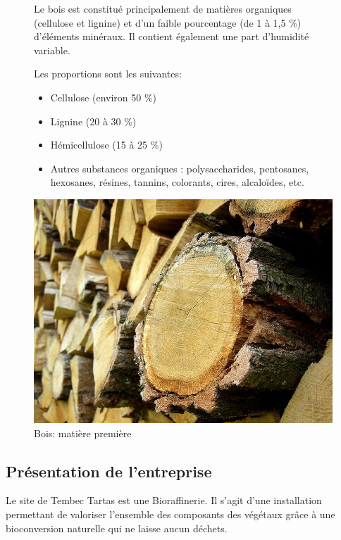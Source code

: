 \begin{figure}[htbp]
\begin{minipage}{0.55\linewidth}

Le bois est constitué principalement de matières organiques (cellulose et lignine) et d'un faible pourcentage (de 1 à 1,5 \%) d'éléments minéraux. Il contient également une part d'humidité variable.

Les proportions sont les suivantes:
\begin{itemize}
 \item Cellulose (environ 50 \%)
 \item Lignine (20 à 30 \%)
 \item Hémicellulose (15 à 25 \%) 
 \item Autres substances organiques : polysaccharides, pentosanes, hexosanes, résines, tannins, colorants, cires, alcaloïdes, etc.
\end{itemize}

\end{minipage}
\hfill
\begin{minipage}{0.35\linewidth}
\includegraphics[width=\linewidth]{img/bois.jpg}
\caption{Bois: matière première}
\label{fig:tartas3}
\end{minipage}
\end{figure}

\subsection{Présentation de l'entreprise}

Le site de Tembec Tartas est une Bioraffinerie. Il s'agit d'une installation permettant de valoriser l'ensemble des composants des végétaux grâce à une bioconversion naturelle qui ne laisse aucun déchets.

